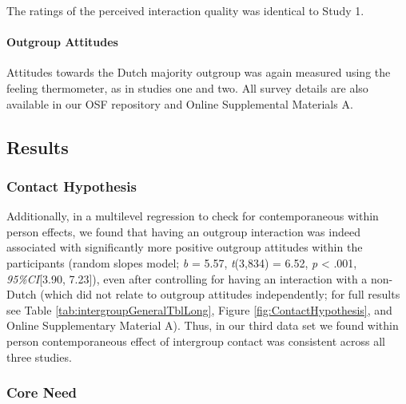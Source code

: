 The ratings of the perceived interaction quality was identical to Study
1.

\paragraph{Outgroup Attitudes}

Attitudes towards the Dutch majority outgroup was again measured using
the feeling thermometer, as in studies one and two. All survey details
are also available in our OSF repository \citep{KreienkampMasked2022a}
and Online Supplemental Materials A.

\subsection{Results}

\subsubsection{Contact Hypothesis}

Additionally, in a multilevel regression to check for contemporaneous
within person effects, we found that having an outgroup interaction was
indeed associated with significantly more positive outgroup attitudes
within the participants (random slopes model; \textit{b} = 5.57,
\textit{t}(3,834) = 6.52, \textit{p} \textless{} .001,
\textit{95\%CI}{[}3.90, 7.23{]}), even after controlling for having an
interaction with a non-Dutch (which did not relate to outgroup attitudes
independently; for full results see Table
\ref{tab:intergroupGeneralTblLong}, Figure \ref{fig:ContactHypothesis},
and Online Supplementary Material A). Thus, in our third data set we
found within person contemporaneous effect of intergroup contact was
consistent across all three studies.

\subsubsection{Core Need}

